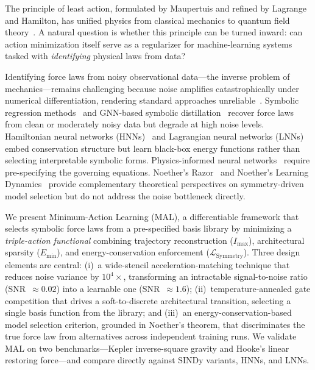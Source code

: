 \documentclass[aps,pre,reprint,superscriptaddress,longbibliography]{revtex4-2}
\begin{document}
The principle of least action, formulated by Maupertuis and refined by Lagrange and Hamilton, has unified physics from classical mechanics to quantum field theory~\cite{Feynman1965}. A natural question is whether this principle can be turned inward: can action minimization itself serve as a regularizer for machine-learning systems tasked with \emph{identifying} physical laws from data?

Identifying force laws from noisy observational data---the inverse problem of mechanics---remains challenging because noise amplifies catastrophically under numerical differentiation, rendering standard approaches unreliable~\cite{Raissi2019, Brunton2016}. Symbolic regression methods~\cite{Udrescu2020, Cranmer2020} and GNN-based symbolic distillation~\cite{Cranmer2020, Lemos2023} recover force laws from clean or moderately noisy data but degrade at high noise levels. Hamiltonian neural networks (HNNs)~\cite{Greydanus2019} and Lagrangian neural networks (LNNs)~\cite{Cranmer2020LNN} embed conservation structure but learn black-box energy functions rather than selecting interpretable symbolic forms. Physics-informed neural networks~\cite{Raissi2019} require pre-specifying the governing equations. Noether's Razor~\cite{vanderOuderaa2024} and Noether's Learning Dynamics~\cite{Tanaka2021} provide complementary theoretical perspectives on symmetry-driven model selection but do not address the noise bottleneck directly.

We present Minimum-Action Learning (MAL), a differentiable framework that selects symbolic force laws from a pre-specified basis library by minimizing a \emph{triple-action functional} combining trajectory reconstruction ($I_{\mathrm{max}}$), architectural sparsity ($E_{\mathrm{min}}$), and energy-conservation enforcement ($\mathcal{L}_{\mathrm{Symmetry}}$). Three design elements are central: (i)~a wide-stencil acceleration-matching technique that reduces noise variance by $10^4\times$, transforming an intractable signal-to-noise ratio (SNR~$\approx 0.02$) into a learnable one (SNR~$\approx 1.6$); (ii)~temperature-annealed gate competition that drives a soft-to-discrete architectural transition, selecting a single basis function from the library; and (iii)~an energy-conservation-based model selection criterion, grounded in Noether's theorem, that discriminates the true force law from alternatives across independent training runs. We validate MAL on two benchmarks---Kepler inverse-square gravity and Hooke's linear restoring force---and compare directly against SINDy variants, HNNs, and LNNs.
\end{document}
